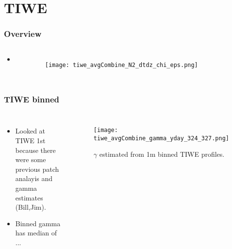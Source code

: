 \documentclass{beamer}
\begin{document}
\section{TIWE}


\begin{frame}
 \frametitle{Overview}

\begin{columns}
\begin{itemize}
\item 
\end{itemize}

\begin{figure}[htbp]
\begin{center}
\texttt{[image: tiwe\_avgCombine\_N2\_dtdz\_chi\_eps.png]}
\caption{}
\label{default}
\end{center}
\end{figure}

\end{columns}


\end{frame}


\begin{frame}
 \frametitle{TIWE binned}

\begin{columns}
\begin{itemize}
\item Looked at TIWE 1st because there were some previous patch analayis and gamma estimates (Bill,Jim).
\item Binned gamma has median of ...
\end{itemize}

\begin{figure}[htbp]
\begin{center}
\texttt{[image: tiwe\_avgCombine\_gamma\_yday\_324\_327.png]}
\caption{$\gamma$ estimated from 1m binned TIWE profiles.}
\label{default}
\end{center}
\end{figure}

\end{columns}


\end{frame}
\end{document}
